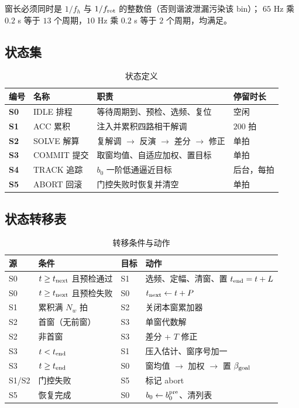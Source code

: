 \documentclass[11pt,a4paper]{ctexart}
\begin{document}
窗长必须同时是 $1/f_h$ 与 $1/f_{\rm rot}$ 的整数倍（否则谐波泄漏污染该 bin）；
$65$ Hz 乘 $0.2$ s 等于 $13$ 个周期，$10$ Hz 乘 $0.2$ s 等于 $2$ 个周期，均满足。

\subsection{状态集}

\begin{table}[H]
\centering
\caption{状态定义}
\label{tab:states}
\begin{tabular}{llll}
\toprule
编号 & 名称 & 职责 & 停留时长\\
\midrule
\textbf{S0} & IDLE 排程 & 等待周期到、预检、选频、复位 & 空闲\\
\textbf{S1} & ACC 累积 & 注入并累积四路相干解调 & $200$ 拍\\
\textbf{S2} & SOLVE 解算 & 复解调 $\to$ 反演 $\to$ 差分 $\to$ 修正 & 单拍\\
\textbf{S3} & COMMIT 提交 & 取窗均值、自适应加权、置目标 & 单拍\\
\textbf{S4} & TRACK 追踪 & $b_0$ 一阶低通逼近目标 & 后台，每拍\\
\textbf{S5} & ABORT 回滚 & 门控失败时恢复并清空 & 单拍\\
\bottomrule
\end{tabular}
\end{table}

\subsection{状态转移表}

\begin{table}[H]
\centering
\caption{转移条件与动作}
\label{tab:trans}
\begin{tabular}{llll}
\toprule
源 & 条件 & 目标 & 动作\\
\midrule
S0 & $t\ge t_{\rm next}$ 且预检通过 & S1 & 选频、定幅、清窗、置 $t_{\rm end}=t+L$\\
S0 & $t\ge t_{\rm next}$ 且预检失败 & S0 & $t_{\rm next}\leftarrow t+P$\\
S1 & 累积满 $N_w$ 拍 & S2 & 关闭本窗累加器\\
S2 & 首窗（无前窗） & S3 & 单窗代数解\\
S2 & 非首窗 & S3 & 差分 + $T$ 修正\\
S3 & $t<t_{\rm end}$ & S1 & 压入估计、窗序号加一\\
S3 & $t\ge t_{\rm end}$ & S0 & 窗均值 $\to$ 加权 $\to$ 置 $\beta_{\rm goal}$\\
S1/S2 & 门控失败 & S5 & 标记 abort\\
S5 & 恢复完成 & S0 & $b_0\leftarrow b_0^{\rm pre}$、清列表\\
\bottomrule
\end{tabular}
\end{table}
\end{document}
